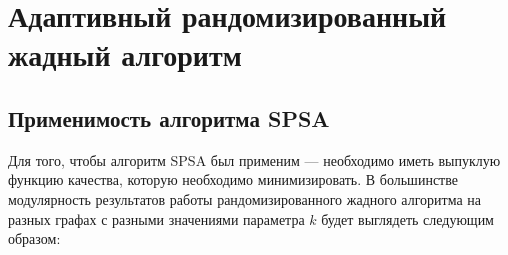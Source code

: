 
\section{Адаптивный рандомизированный жадный алгоритм}



\subsection{Применимость алгоритма SPSA}

Для того, чтобы алгоритм SPSA был применим --- необходимо иметь выпуклую функцию качества, которую необходимо минимизировать. В большинстве модулярность результатов работы рандомизированного жадного алгоритма на разных графах с разными значениями параметра $k$ будет выглядеть следующим образом:

